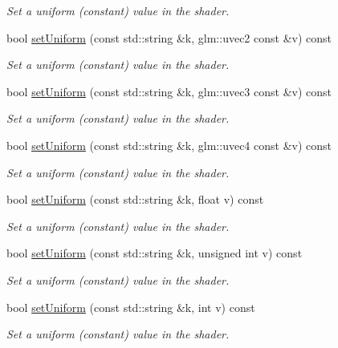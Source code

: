 \begin{DoxyCompactItemize}
\begin{DoxyCompactList}\small\item\em Set a uniform (constant) value in the shader. \end{DoxyCompactList}\item 
bool \hyperlink{classgdl_1_1_a_shader_a93d3a6b717cf50326e3c0ca544131845}{set\-Uniform} (const std\-::string \&k, glm\-::uvec2 const \&v) const 
\begin{DoxyCompactList}\small\item\em Set a uniform (constant) value in the shader. \end{DoxyCompactList}\item 
bool \hyperlink{classgdl_1_1_a_shader_a4670bdbe89a3e37d92d035510837465e}{set\-Uniform} (const std\-::string \&k, glm\-::uvec3 const \&v) const 
\begin{DoxyCompactList}\small\item\em Set a uniform (constant) value in the shader. \end{DoxyCompactList}\item 
bool \hyperlink{classgdl_1_1_a_shader_a8b800fb21a0071a28e6093ab99501ae8}{set\-Uniform} (const std\-::string \&k, glm\-::uvec4 const \&v) const 
\begin{DoxyCompactList}\small\item\em Set a uniform (constant) value in the shader. \end{DoxyCompactList}\item 
bool \hyperlink{classgdl_1_1_a_shader_aa166b1e4cd12cf7e157659946861d121}{set\-Uniform} (const std\-::string \&k, float v) const 
\begin{DoxyCompactList}\small\item\em Set a uniform (constant) value in the shader. \end{DoxyCompactList}\item 
bool \hyperlink{classgdl_1_1_a_shader_ad6091e0ccecf8c062e46482d793e0d6c}{set\-Uniform} (const std\-::string \&k, unsigned int v) const 
\begin{DoxyCompactList}\small\item\em Set a uniform (constant) value in the shader. \end{DoxyCompactList}\item 
bool \hyperlink{classgdl_1_1_a_shader_adde4f6da14c5fd786152d81d0a3bb77f}{set\-Uniform} (const std\-::string \&k, int v) const 
\begin{DoxyCompactList}\small\item\em Set a uniform (constant) value in the shader. \end{DoxyCompactList}\item 

\end{DoxyCompactItemize}
